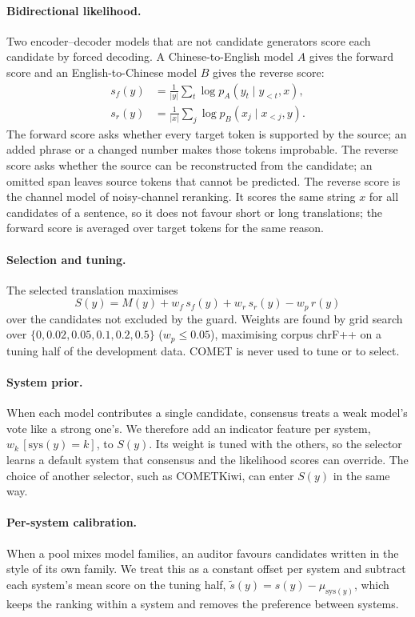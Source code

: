 \documentclass[11pt]{article}
\begin{document}
\paragraph{Bidirectional likelihood.}
Two encoder--decoder models that are not candidate generators score each candidate by forced decoding. A Chinese-to-English model $A$ gives the forward score and an English-to-Chinese model $B$ gives the reverse score:
\begin{align*}
s_f(y)&=\frac{1}{|y|}\sum_{t}\log p_A(y_t\mid y_{<t},x),\\
s_r(y)&=\frac{1}{|x|}\sum_{j}\log p_B(x_j\mid x_{<j},y).
\end{align*}
The forward score asks whether every target token is supported by the source; an added phrase or a changed number makes those tokens improbable. The reverse score asks whether the source can be reconstructed from the candidate; an omitted span leaves source tokens that cannot be predicted. The reverse score is the channel model of noisy-channel reranking. It scores the same string $x$ for all candidates of a sentence, so it does not favour short or long translations; the forward score is averaged over target tokens for the same reason.

\paragraph{Selection and tuning.}
The selected translation maximises
\[
S(y)=M(y)+w_f\,s_f(y)+w_r\,s_r(y)-w_p\,r(y)
\]
over the candidates not excluded by the guard. Weights are found by grid search over $\{0,0.02,0.05,0.1,0.2,0.5\}$ ($w_p\le 0.05$), maximising corpus chrF++ on a tuning half of the development data. COMET is never used to tune or to select.

\paragraph{System prior.}
When each model contributes a single candidate, consensus treats a weak model's vote like a strong one's. We therefore add an indicator feature per system, $w_k\,[\mathrm{sys}(y)=k]$, to $S(y)$. Its weight is tuned with the others, so the selector learns a default system that consensus and the likelihood scores can override. The choice of another selector, such as COMETKiwi, can enter $S(y)$ in the same way.

\paragraph{Per-system calibration.}
When a pool mixes model families, an auditor favours candidates written in the style of its own family. We treat this as a constant offset per system and subtract each system's mean score on the tuning half, $\tilde{s}(y)=s(y)-\mu_{\mathrm{sys}(y)}$, which keeps the ranking within a system and removes the preference between systems.
\end{document}

